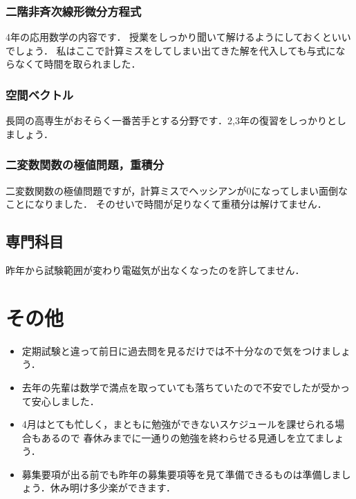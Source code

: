 \documentclass[dvipdfmx]{jsarticle}
\begin{document}
\subsubsection*{二階非斉次線形微分方程式}
4年の応用数学の内容です．
授業をしっかり聞いて解けるようにしておくといいでしょう．
私はここで計算ミスをしてしまい出てきた解を代入しても与式にならなくて時間を取られました．

\subsubsection*{空間ベクトル}
長岡の高専生がおそらく一番苦手とする分野です．2,3年の復習をしっかりとしましょう．

\subsubsection*{二変数関数の極値問題，重積分}
二変数関数の極値問題ですが，計算ミスでヘッシアンが0になってしまい面倒なことになりました．
そのせいで時間が足りなくて重積分は解けてません．


\subsection{専門科目}
昨年から試験範囲が変わり電磁気が出なくなったのを許してません．


\section{その他}
\begin{itemize}
  \item 定期試験と違って前日に過去問を見るだけでは不十分なので気をつけましょう．
  \item 去年の先輩は数学で満点を取っていても落ちていたので不安でしたが受かって安心しました．
  \item 4月はとても忙しく，まともに勉強ができないスケジュールを課せられる場合もあるので
        春休みまでに一通りの勉強を終わらせる見通しを立てましょう．
  \item 募集要項が出る前でも昨年の募集要項等を見て準備できるものは準備しましょう．休み明け多少楽ができます．
\end{itemize}
\end{document}
